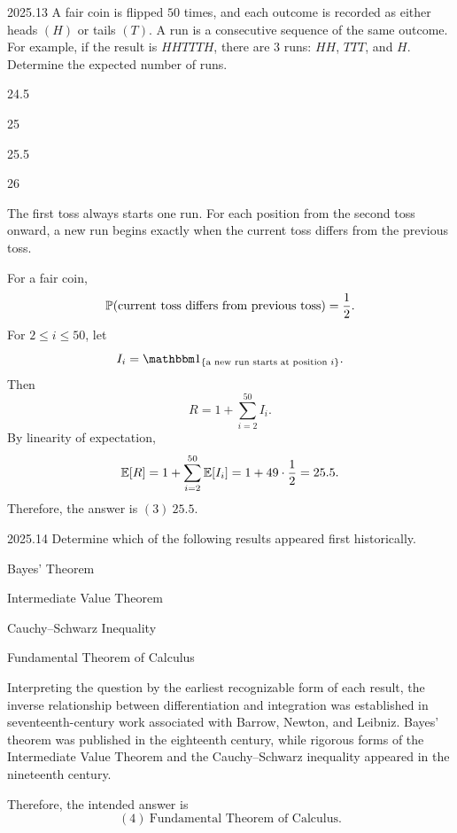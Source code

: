     \begin{pastproblem}{2025.13}
        A fair coin is flipped $50$ times, and each outcome is recorded as either heads $(H)$ or
        tails $(T)$. A run is a consecutive sequence of the same outcome. For example, if the
        result is
        $HHTTTH$, there are $3$ runs: $HH$, $TTT$, and $H$. Determine the expected number of runs.
        \begin{problemchoices}
            \item 24.5
            \item 25
            \item 25.5
            \item 26
        \end{problemchoices}
    \end{pastproblem}

    \begin{solution}
        The first toss always starts one run. For each position from the second toss onward, a new
        run begins exactly when the current toss differs from the previous toss.

        For a fair coin,
        \[
            \mathbb{P}(\text{current toss differs from previous toss})=\frac12.
        \]
        For $2\leq i\leq50$, let
        \[
            I_i
            =
            \indicatorbb{\{\text{a new run starts at position }i\}}.
        \]
        Then
        \[
            R=1+\sum_{i=2}^{50}I_i.
        \]
        By linearity of expectation,
        \[
            \mathbb{E}[R]
            =
            1+\sum_{i=2}^{50}\mathbb{E}[I_i]
            =
            1+49\cdot\frac12
            =
            25.5.
        \]
        Therefore, the answer is $\boxed{(3)\ 25.5}$.
    \end{solution}

    \begin{pastproblem}{2025.14}
        Determine which of the following results appeared first historically.
        \begin{problemchoices}
            \item Bayes' Theorem
            \item Intermediate Value Theorem
            \item Cauchy--Schwarz Inequality
            \item Fundamental Theorem of Calculus
        \end{problemchoices}
    \end{pastproblem}

    \begin{solution}
        Interpreting the question by the earliest recognizable form of each
        result, the inverse relationship between differentiation and integration
        was established in seventeenth-century work associated with Barrow,
        Newton, and Leibniz. Bayes' theorem was published in the eighteenth
        century, while rigorous forms of the Intermediate Value Theorem and the
        Cauchy--Schwarz inequality appeared in the nineteenth century.

        Therefore, the intended answer is
        \[
            \boxed{(4)\ \text{Fundamental Theorem of Calculus}}.
        \]
    \end{solution}

